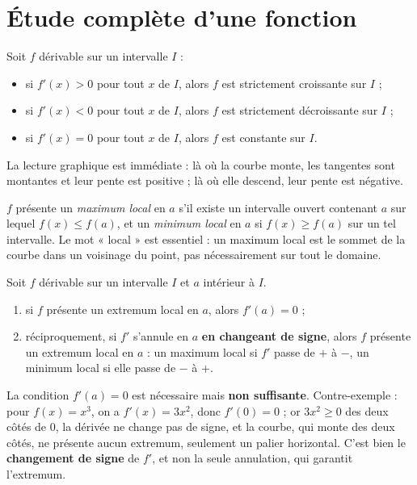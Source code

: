 \section{Étude complète d'une fonction}

\begin{propriete}
Soit $f$ dérivable sur un intervalle $I$ :
\begin{itemize}
\item si $f'(x) > 0$ pour tout $x$ de $I$, alors $f$ est strictement croissante sur $I$ ;
\item si $f'(x) < 0$ pour tout $x$ de $I$, alors $f$ est strictement décroissante sur $I$ ;
\item si $f'(x) = 0$ pour tout $x$ de $I$, alors $f$ est constante sur $I$.
\end{itemize}
La lecture graphique est immédiate : là où la courbe monte, les tangentes sont montantes et leur pente est positive ; là où elle descend, leur pente est négative.
\end{propriete}

\begin{definition}
$f$ présente un \emph{maximum local} en $a$ s'il existe un intervalle ouvert contenant $a$ sur lequel $f(x) \leq f(a)$, et un \emph{minimum local} en $a$ si $f(x) \geq f(a)$ sur un tel intervalle. Le mot « local » est essentiel : un maximum local est le sommet de la courbe dans un voisinage du point, pas nécessairement sur tout le domaine.
\end{definition}

\begin{theoreme}
Soit $f$ dérivable sur un intervalle $I$ et $a$ intérieur à $I$.
\begin{enumerate}
\item si $f$ présente un extremum local en $a$, alors $f'(a) = 0$ ;
\item réciproquement, si $f'$ s'annule en $a$ \textbf{en changeant de signe}, alors $f$ présente un extremum local en $a$ : un maximum local si $f'$ passe de $+$ à $-$, un minimum local si elle passe de $-$ à $+$.
\end{enumerate}
\end{theoreme}

\begin{attention}
La condition $f'(a) = 0$ est nécessaire mais \textbf{non suffisante}. Contre-exemple : pour $f(x) = x^{3}$, on a $f'(x) = 3x^{2}$, donc $f'(0) = 0$ ; or $3x^{2} \geq 0$ des deux côtés de $0$, la dérivée ne change pas de signe, et la courbe, qui monte des deux côtés, ne présente aucun extremum, seulement un palier horizontal. C'est bien le \textbf{changement de signe} de $f'$, et non la seule annulation, qui garantit l'extremum.
\end{attention}

